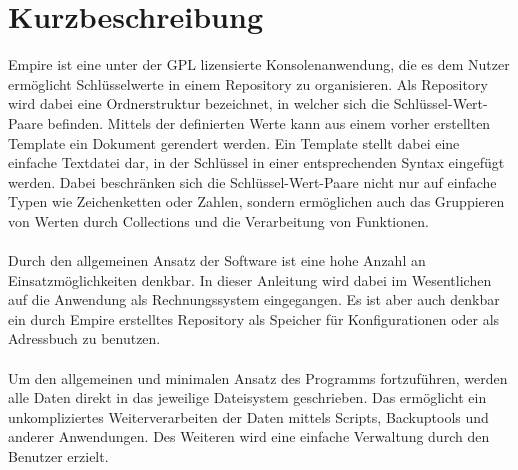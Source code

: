 
\section{Kurzbeschreibung}

Empire ist eine unter der GPL lizensierte Konsolenanwendung, die es dem Nutzer ermöglicht Schlüsselwerte in einem Repository zu organisieren.
Als Repository wird dabei eine Ordnerstruktur bezeichnet, in welcher sich die Schlüssel-Wert-Paare befinden.
Mittels der definierten Werte kann aus einem vorher erstellten Template ein Dokument gerendert werden. Ein Template stellt dabei eine einfache
Textdatei dar, in der Schlüssel in einer entsprechenden Syntax eingefügt werden. Dabei beschränken sich die Schlüssel-Wert-Paare nicht nur auf einfache
Typen wie Zeichenketten oder Zahlen, sondern ermöglichen auch das Gruppieren von Werten durch Collections und die Verarbeitung von Funktionen.
\\\\
Durch den allgemeinen Ansatz der Software ist eine hohe Anzahl an Einsatzmöglichkeiten denkbar. In dieser Anleitung wird dabei im Wesentlichen
auf die Anwendung als Rechnungssystem eingegangen. Es ist aber auch denkbar ein durch Empire erstelltes Repository als Speicher für Konfigurationen
oder als Adressbuch zu benutzen.
\\\\
Um den allgemeinen und minimalen Ansatz des Programms fortzuführen, werden alle Daten direkt in das jeweilige Dateisystem geschrieben.
Das ermöglicht ein unkompliziertes Weiterverarbeiten der Daten mittels Scripts, Backuptools und anderer Anwendungen. Des Weiteren wird eine einfache Verwaltung durch den Benutzer erzielt.

